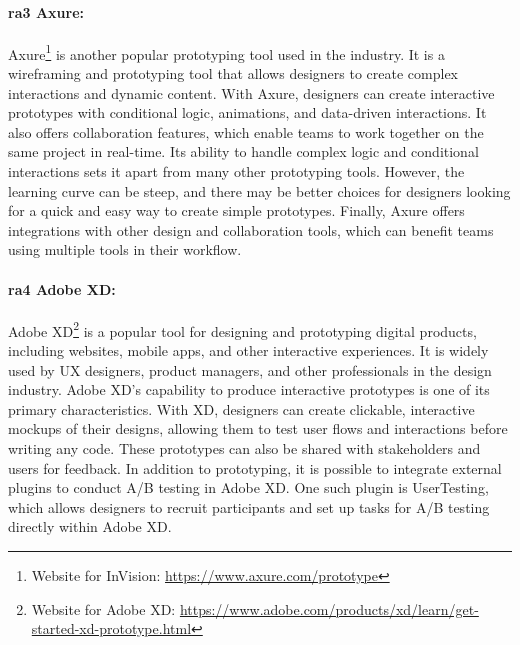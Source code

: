 \paragraph{\ac{ra}3 Axure:}
Axure\footnote{Website for InVision: \url{https://www.axure.com/prototype}} is another popular prototyping tool used in the industry. 
It is a wireframing and prototyping tool that allows designers to create complex interactions and dynamic content. 
With Axure, designers can create interactive prototypes with conditional logic, animations, and data-driven interactions. 
It also offers collaboration features, which enable teams to work together on the same project in real-time.
Its ability to handle complex logic and conditional interactions sets it apart from many other prototyping tools. 
However, the learning curve can be steep, and there may be better choices for designers looking for a quick and easy way to create simple prototypes.
Finally, Axure offers integrations with other design and collaboration tools, which can benefit teams using multiple tools in their workflow.

\paragraph{\ac{ra}4 Adobe XD:}
Adobe XD\footnote{Website for Adobe XD: \url{https://www.adobe.com/products/xd/learn/get-started-xd-prototype.html}} is a popular tool for designing and prototyping digital products, including websites, mobile apps, and other interactive experiences. 
It is widely used by UX designers, product managers, and other professionals in the design industry. 
Adobe XD's capability to produce interactive prototypes is one of its primary characteristics.
With XD, designers can create clickable, interactive mockups of their designs, allowing them to test user flows and interactions before writing any code. 
These prototypes can also be shared with stakeholders and users for feedback.
In addition to prototyping, it is possible to integrate external plugins to conduct A/B testing in Adobe XD. 
One such plugin is UserTesting, which allows designers to recruit participants and set up tasks for A/B testing directly within Adobe XD. 

